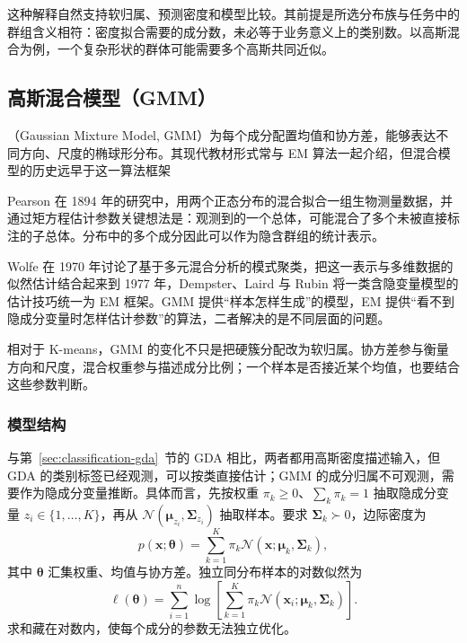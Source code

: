 这种解释自然支持软归属、预测密度和模型比较。其前提是所选分布族与任务中的群组含义相符：密度拟合需要的成分数，未必等于业务意义上的类别数。以高斯混合为例，一个复杂形状的群体可能需要多个高斯共同近似。

\subsection{高斯混合模型（GMM）}
\label{sec:clustering-gmm}

（Gaussian Mixture Model, GMM）为每个成分配置均值和协方差，能够表达不同方向、尺度的椭球形分布。其现代教材形式常与 EM 算法一起介绍，但混合模型的历史远早于这一算法框架

Pearson 在 1894 年的研究中，用两个正态分布的混合拟合一组生物测量数据，并通过矩方程估计参数关键想法是：观测到的一个总体，可能混合了多个未被直接标注的子总体。分布中的多个成分因此可以作为隐含群组的统计表示。

Wolfe 在 1970 年讨论了基于多元混合分析的模式聚类，把这一表示与多维数据的似然估计结合起来到 1977 年，Dempster、Laird 与 Rubin 将一类含隐变量模型的估计技巧统一为 EM 框架。GMM 提供“样本怎样生成”的模型，EM 提供“看不到隐成分变量时怎样估计参数”的算法，二者解决的是不同层面的问题。

相对于 K-means，GMM 的变化不只是把硬簇分配改为软归属。协方差参与衡量方向和尺度，混合权重参与描述成分比例；一个样本是否接近某个均值，也要结合这些参数判断。

\subsubsection{模型结构}

与第~\ref{sec:classification-gda}~节的 GDA 相比，两者都用高斯密度描述输入，但 GDA 的类别标签已经观测，可以按类直接估计；GMM 的成分归属不可观测，需要作为隐成分变量推断。具体而言，先按权重 $\pi_k\geq0$、$\sum_k\pi_k=1$ 抽取隐成分变量 $z_i\in\{1,\ldots,K\}$，再从 $\mathcal{N}(\bm{\mu}_{z_i},\bm{\Sigma}_{z_i})$ 抽取样本。要求 $\bm{\Sigma}_k\succ0$，边际密度为
\begin{equation}
 p(\bm{x};\bm{\theta})
 =\sum_{k=1}^K\pi_k
   \mathcal{N}(\bm{x};\bm{\mu}_k,\bm{\Sigma}_k),
 \label{eq:clustering-gmm}
\end{equation}
其中 $\bm{\theta}$ 汇集权重、均值与协方差。独立同分布样本的对数似然为
\[
 \ell(\bm{\theta})
 =\sum_{i=1}^n\log\left[
 \sum_{k=1}^K\pi_k
 \mathcal{N}(\bm{x}_i;\bm{\mu}_k,\bm{\Sigma}_k)\right].
\]
求和藏在对数内，使每个成分的参数无法独立优化。

